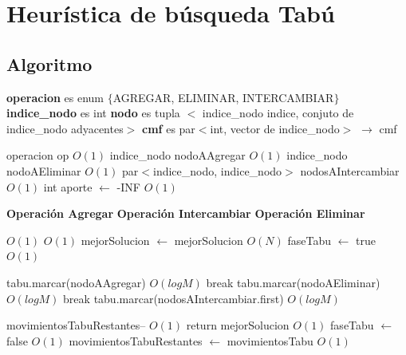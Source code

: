\documentclass[a4paper, 10pt, twoside]{article}
\newenvironment{pseudo}[1][]{%
    \vspace{1em}%
    \begin{algorithmic}%
}
{%
    \end{algorithmic}%
    \vspace{1em}%
}
\newcommand{\Ode}[1]{\hfill $O(#1)$}
\begin{document}
\newpage

\section{Heurística de búsqueda Tabú}
\subsection{Algoritmo}

\begin{pseudo}

\State \textbf{operacion} es enum $\lbrace$AGREGAR, ELIMINAR, INTERCAMBIAR$\rbrace$
\State \textbf{indice\_nodo} es int
\State \textbf{nodo} es tupla $<$ indice\_nodo indice, conjuto de indice\_nodo adyacentes$>$
\State \textbf{cmf} es par$<$int, vector de indice\_nodo$>$
\State
{} $\rightarrow$ cmf
	

	\State operacion op 																		\Ode{1}
	\State indice\_nodo nodoAAgregar															\Ode{1}
	\State indice\_nodo nodoAEliminar															\Ode{1}
	\State par$<$indice\_nodo, indice\_nodo$>$ nodosAIntercambiar								\Ode{1}
	\State int aporte $\leftarrow$ -INF															\Ode{1}

	\State
	\State \textbf{Operación Agregar}
	\State
	\State \textbf{Operación Intercambiar}
	\State
	\State \textbf{Operación Eliminar}
	\State

																				\Ode{1}
																					\Ode{1}
				\State mejorSolucion $\leftarrow$ mejorSolucion 								\Ode{N}
				\State faseTabu $\leftarrow$ true 												\Ode{1}
			\EndIf

				    \State tabu.marcar(nodoAAgregar)										 	\Ode{log M}	
				    \State break
				\EndCase
					\State  tabu.marcar(nodoAEliminar) 											\Ode{log M}
					\State break
				\EndCase
					\State tabu.marcar(nodosAIntercambiar.first)								\Ode{log M}
				\EndCase
			\EndSwitch

			\State movimientosTabuRestantes--													\Ode{1}
			 return mejorSolucion
			\EndIf
		\Else
			          \Ode{1}
				\State faseTabu $\leftarrow$ false 												\Ode{1}
				\State movimientosTabuRestantes $\leftarrow$ movimientosTabu 					\Ode{1}
			\EndIf
		\EndIf



\end{pseudo}
\end{document}
